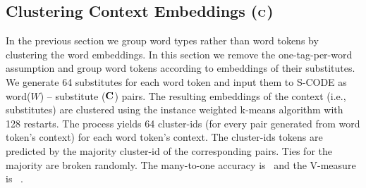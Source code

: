 \subsection{Clustering Context Embeddings (${\bf C}$)}
\label{sec:clustering-c}

In the previous section we group word types rather than word tokens by
clustering the word embeddings.  In this section we remove the
one-tag-per-word assumption and group word tokens according to
embeddings of their substitutes.  We generate 64 substitutes for each
word token and input them to S-CODE as word($W$) -- substitute (${\bf C}$)
pairs.  The resulting embeddings of the context (i.e., substitutes)
are clustered using the instance weighted k-means algorithm with 128
restarts.  The process yields 64 cluster-ids (for every pair generated
from word token's context) for each word token's context.  The
cluster-ids tokens are predicted by the majority cluster-id of the
corresponding pairs.  Ties for the majority are broken randomly.  The
many-to-one accuracy is \wsymto\ and the V-measure is \wsyvm\ .

